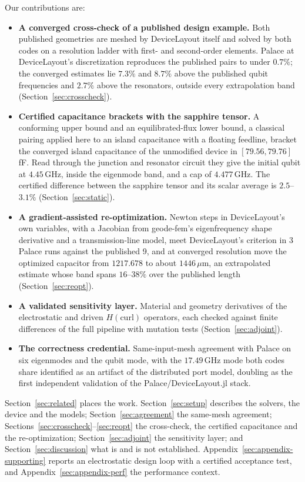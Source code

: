 \documentclass{anvil-paper}
\begin{document}
Our contributions are:
\begin{itemize}
  \item \textbf{A converged cross-check of a published design example.}
    Both published geometries are meshed by DeviceLayout itself and solved
    by both codes on a resolution ladder with first- and second-order
    elements. Palace at DeviceLayout's discretization reproduces the
    published pairs to under $0.7\%$; the converged estimates lie
    $7.3\%$ and $8.7\%$ above the published qubit frequencies and $2.7\%$
    above the resonators, outside every extrapolation band
    (Section~\ref{sec:crosscheck}).
  \item \textbf{Certified capacitance brackets with the sapphire tensor.}
    A conforming upper bound and an equilibrated-flux lower bound, a
    classical pairing applied here to an island capacitance with a
    floating feedline, bracket the converged island capacitance of the
    unmodified device in $[79.56, 79.76]$\,fF. Read through the junction
    and resonator circuit they give the initial qubit at $4.45$\,GHz,
    inside the eigenmode band, and a cap of $4.477$\,GHz. The certified
    difference between the sapphire tensor and its scalar average is
    $2.5$--$3.1\%$ (Section~\ref{sec:static}).
  \item \textbf{A gradient-assisted re-optimization.} Newton steps in
    DeviceLayout's own variables, with a Jacobian from geode-fem's
    eigenfrequency shape derivative and a transmission-line model,
    meet DeviceLayout's criterion in 3 Palace runs against the published
    9, and at converged resolution move the optimized capacitor from
    $1217.678$ to about $1446\,\mu$m, an extrapolated estimate whose band
    spans $16$--$38\%$ over the published length
    (Section~\ref{sec:reopt}).
  \item \textbf{A validated sensitivity layer.} Material and geometry
    derivatives of the electrostatic and driven $H(\mathrm{curl})$
    operators, each checked against finite differences of the full
    pipeline with mutation tests (Section~\ref{sec:adjoint}).
  \item \textbf{The correctness credential.} Same-input-mesh agreement
    with Palace on six eigenmodes and the qubit mode, with the
    $17.49$\,GHz mode both codes share identified as an artifact of the
    distributed port model, doubling as the first independent validation of the
    Palace/DeviceLayout.jl stack.
\end{itemize}

Section~\ref{sec:related} places the work. Section~\ref{sec:setup}
describes the solvers, the device and the models;
Section~\ref{sec:agreement} the same-mesh agreement;
Sections~\ref{sec:crosscheck}--\ref{sec:reopt} the cross-check, the
certified capacitance and the re-optimization;
Section~\ref{sec:adjoint} the sensitivity layer; and
Section~\ref{sec:discussion} what is and is not established.
Appendix~\ref{sec:appendix-supporting} reports an electrostatic design
loop with a certified acceptance test, and
Appendix~\ref{sec:appendix-perf} the performance context.
\end{document}
